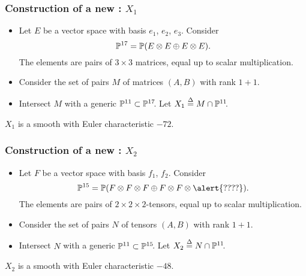 \begin{frame}
    \frametitle{Construction of a new \CY: $X_1$}

    \begin{itemize}
	    \item
        Let $E$ be a vector space with basis $e_1$, $e_2$, $e_3$. Consider
        \[
            \P^{17} = \P(E \otimes E \oplus E \otimes E).
        \]
        The elements are pairs of $3 \times 3$ matrices, equal up to scalar multiplication.

        \item
        Consider the set of pairs $M$ of matrices $(A, B)$ with rank $1 + 1$.

        \item
        Intersect $M$ with a generic $\P^{11} \subset \P^{17}\mkern-4mu$. Let $X_1 \defeq M \cap \P^{11}\mkern-4mu$.
    \end{itemize}

    \begin{theorem}
        $X_1$ is a smooth \CY with Euler characteristic $-72$.
    \end{theorem}
\end{frame}


\begin{frame}
    \frametitle{Construction of a new \CY: $X_2$}

    \begin{itemize}
    	\item Let $F$ be a vector space with basis $f_1$, $f_2$. Consider
	    \[
            \P^{15} = \P(F \otimes F \otimes F \oplus F \otimes F \otimes\alert{????}).
	    \]
	    The elements are pairs of $2 \times 2 \times 2$-tensors, equal up to scalar multiplication.

	    \item
	    Consider the set of pairs $N$ of tensors $(A, B)$ with rank $1 + 1$.

	    \item
	    Intersect $N$ with a generic $\P^{11} \subset \P^{15}\mkern-4mu$. Let $X_2 \defeq N \cap \P^{11}\mkern-4mu$.
    \end{itemize}

    \begin{theorem}
        $X_2$ is a smooth \CY with Euler characteristic $-48$.
    \end{theorem}
\end{frame}

